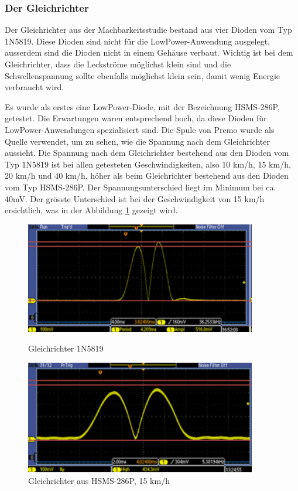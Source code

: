 \subsubsection{Der Gleichrichter}

Der Gleichrichter aus der Machbarkeitsstudie bestand aus vier Dioden vom Typ 1N5819. Diese Dioden sind nicht für die LowPower-Anwendung ausgelegt, ausserdem sind die Dioden nicht in einem Gehäuse verbaut. Wichtig ist bei dem Gleichrichter, dass die Leckströme möglichst klein sind und die Schwellenspannung sollte ebenfalls möglichst klein sein, damit wenig Energie verbraucht wird.

Es wurde als erstes eine LowPower-Diode, mit der Bezeichnung HSMS-286P, getestet. Die Erwartungen waren entsprechend hoch, da diese Dioden für LowPower-Anwendungen spezialisiert sind. Die Spule von Premo wurde als Quelle verwendet, um zu sehen, wie die Spannung nach dem Gleichrichter aussieht. Die Spannung nach dem Gleichrichter bestehend aus den Dioden vom Typ 1N5819 ist bei allen getesteten Geschwindigkeiten, also 10 km/h, 15 km/h, 20 km/h und 40 km/h, höher als beim Gleichrichter bestehend aus den Dioden vom Typ HSMS-286P. Der Spannungsunterschied liegt im Minimum bei ca. 40mV. Der grösste Unterschied ist bei der Geschwindigkeit von 15 km/h ersichtlich, was in der Abbildung \ref{messung_optimierung_gleichrichter_1} gezeigt wird.

\begin{figure}[ht]
 \begin{minipage}[t]{0.5\textwidth}
    \includegraphics[width=0.9\textwidth]{3Vorgehen/imag/Messung_Optimierung_Gleichrichter_1_links.png}
    \caption{Gleichrichter 1N5819}
    \label{messung_optimierung_gleichrichter_1} 
 \end{minipage}
 \begin{minipage}[t]{0.5\textwidth}
    \includegraphics[width=0.9\textwidth]{3Vorgehen/imag/Messung_Optimierung_Gleichrichter_1_rechts.png}
    \caption{Gleichrichter aus HSMS-286P, 15 km/h}
 \end{minipage}
\end{figure}

